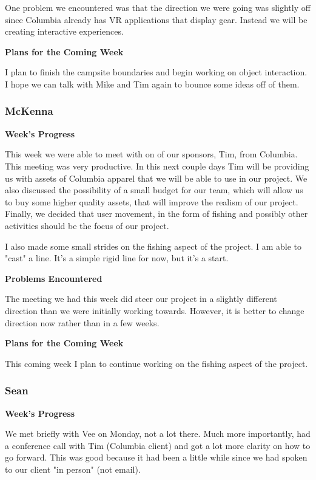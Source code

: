 \documentclass[10pt,journal,compsoc,onecolumn, draftclsnofoot]{IEEEtran}
\begin{document}
One problem we encountered was that the direction we were going was slightly off since Columbia already has VR applications that display gear. Instead we will be creating interactive experiences.

\noindent \textbf{Plans for the Coming Week}

I plan to finish the campsite boundaries and begin working on object interaction. I hope we can talk with Mike and Tim again to bounce some ideas off of them.

\subsubsection{McKenna}
\noindent \textbf{Week's Progress}

This week we were able to meet with on of our sponsors, Tim, from Columbia. This meeting was very productive. In this next couple days Tim will be providing us with assets of Columbia apparel that we will be able to use in our project. We also discussed the possibility of a small budget for our team, which will allow us to buy some higher quality assets, that will improve the realism of our project. Finally, we decided that user movement, in the form of fishing and possibly other activities should be the focus of our project.

I also made some small strides on the fishing aspect of the project. I am able to "cast" a line. It's a simple rigid line for now, but it's a start.

\noindent \textbf{Problems Encountered}

The meeting we had this week did steer our project in a slightly different direction than we were initially working towards. However, it is better to change direction now rather than in a few weeks.

\noindent \textbf{Plans for the Coming Week}

This coming week I plan to continue working on the fishing aspect of the project.

\subsubsection{Sean}
\noindent \textbf{Week's Progress}

We met briefly with Vee on Monday, not a lot there. Much more importantly, had a conference call with Tim (Columbia client) and got a lot more clarity on how to go forward. This was good because it had been a little while since we had spoken to our client "in person" (not email).
\end{document}

